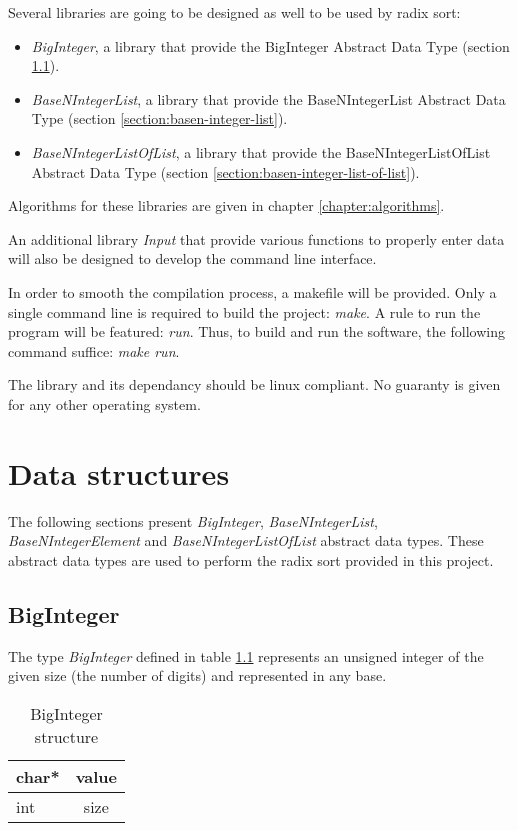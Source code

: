 \documentclass[book, nodocumentinfo]{upmethodology-document}
\begin{document}
Several libraries are going to be designed as well to be used by radix sort:
\begin{itemize}
    \item \emph{BigInteger}, a library that provide the
        BigInteger Abstract Data Type (section \ref{section:big-integer}).
    \item \emph{BaseNIntegerList}, a library that provide the
        BaseNIntegerList Abstract Data Type (section \ref{section:basen-integer-list}).
    \item \emph{BaseNIntegerListOfList}, a library that provide the
        BaseNIntegerListOfList Abstract Data Type (section \ref{section:basen-integer-list-of-list}).
\end{itemize}

Algorithms for these libraries are given in chapter \ref{chapter:algorithms}.

An additional library \emph{Input} that provide various functions to properly enter data will also be designed
to develop the command line interface.

In order to smooth the compilation process, a makefile will be provided.
Only a single command line is required to build the project: \emph{make}.
A rule to run the program will be featured: \emph{run}.
Thus, to build and run the software, the following command suffice: \emph{make run}.

The library and its dependancy should be linux compliant.
No guaranty is given for any other operating system.

\chapter{Data structures} \label{chapter:data-structures}

The following sections present \emph{BigInteger}, \emph{BaseNIntegerList}, \emph{BaseNIntegerElement} and \emph{BaseNIntegerListOfList} abstract data types.
These abstract data types are used to perform the radix sort provided in this project.

\section{BigInteger} \label{section:big-integer}

The type \emph{BigInteger} defined in table \ref{tab:big-integer-struct} represents an unsigned integer
of the given size (the number of digits) and represented in any base.

\begin{table}[h]
    \centering
    \label{tab:big-integer-struct}

    \begin{tabular}{|l|c|}
        \hline
        char* & value \\
        \hline
        int & size \\
        \hline
    \end{tabular}

    \caption{BigInteger structure}
\end{table}
\end{document}
